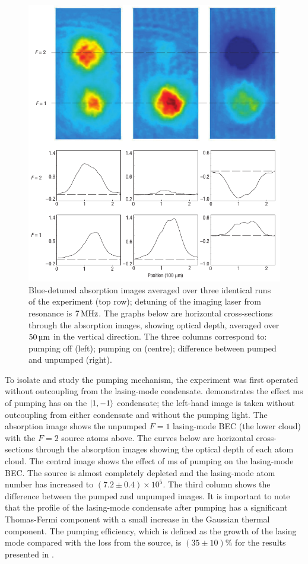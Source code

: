 \begin{figure}
    \centering
    \includegraphics[width=12cm]{ExperimentalResults}
    \caption{Blue-detuned absorption images averaged over three identical runs of the experiment (top row); detuning of the imaging laser from resonance is $\unit[7]{MHz}$.  The graphs below are horizontal cross-sections through the absorption images, showing optical depth, averaged over $\unit[50]{\micro m}$ in the vertical direction.  The three columns correspond to: pumping off (left); pumping on (centre); difference between pumped and unpumped (right).}
    \label{OpticalPumping:ExperimentalResults}
\end{figure}

To isolate and study the pumping mechanism, the experiment was first operated without outcoupling from the lasing-mode condensate.   demonstrates the effect \unit[200]{ms} of pumping has on the ${\left|1, -1\right>}$ condensate; the left-hand image is taken without outcoupling from either condensate and without the pumping light.  The absorption image shows the unpumped $F=1$ lasing-mode BEC (the lower cloud) with the $F=2$ source atoms above.  The curves below are horizontal cross-sections through the absorption images showing the optical depth of each atom cloud.  The central image shows the effect of \unit[200]{ms} of pumping on the lasing-mode BEC.   The source is almost completely depleted and the lasing-mode atom number has increased to $(7.2 \pm 0.4)\times 10^5$.  The third column shows the difference between the pumped and unpumped images. It is important to note that the profile of the lasing-mode condensate after pumping has a significant Thomas-Fermi component with a small increase in the Gaussian thermal component.  The pumping efficiency, which is defined as the growth of the lasing mode compared with the loss from the source, is $(35 \pm 10)\%$ for the results presented in .

